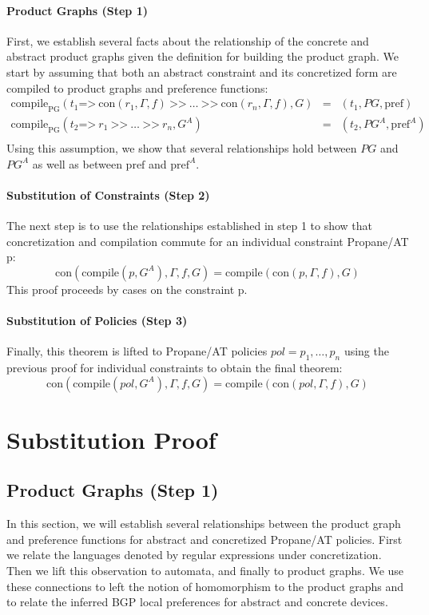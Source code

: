 \documentclass[twocolumn, openany]{sig-alternate-10pt}
\newcommand{\sysname}{{\small \sf Propane/AT}\xspace}
\newcommand{\para}[1]{\paragraph*{\textbf{#1}}}
\newcommand{\Prefer}{\texttt{>>}}
\newcommand{\Path}{\texttt{=>}}
\newcommand{\Con}{\mathrm{con}}
\newcommand{\CompilePg}{\ensuremath{\mathrm{compile}_\mathrm{PG}}}
\newcommand{\Compile}{\ensuremath{\mathrm{compile}}}
\newcommand{\Pref}{\ensuremath{\mathrm{pref}}}
\begin{document}
\para{Product Graphs (Step 1)} First, we establish several facts about the relationship of the concrete and abstract product graphs given the definition for building the product graph. We start by assuming that both an abstract constraint and its concretized form are compiled to product graphs and preference functions: 
%
\[
\begin{array}{lll}
  \CompilePg(t_1 \Path~ \Con(r_1,\Gamma,f) ~\Prefer~ \ldots ~\Prefer~ \Con(r_n,\Gamma,f), G) &=& (t_1, PG, \Pref) \\
  \CompilePg(t_2 \Path~ r_1 ~\Prefer~ \ldots ~\Prefer~ r_n, G^A) &=& (t_2, PG^A, \Pref^A) \\
\end{array}
\]
%
Using this assumption, we show that several relationships hold between $PG$ and $PG^A$ as well as between $\Pref$ and $\Pref^A$. 

\para{Substitution of Constraints (Step 2)} The next step is to use the relationships established in step 1 to show that concretization and compilation commute for an individual constraint \sysname p:
%
$$\Con(\Compile(p, G^A), \Gamma, f, G) = \Compile(\Con(p,\Gamma,f), G)$$
%
This proof proceeds by cases on the constraint p.

\para{Substitution of Policies (Step 3)} Finally, this theorem is lifted to \sysname policies $pol = p_1, \ldots, p_n$ using the previous proof for individual constraints to obtain the final theorem:
%
$$\Con(\Compile(pol,G^A),\Gamma,f,G) = \Compile(\Con(pol,\Gamma,f), G)$$ 

\newpage


\section{Substitution Proof}

\subsection{Product Graphs (Step 1)}
In this section, we will establish several relationships between the product graph and preference functions for abstract and concretized \sysname policies. First we relate the languages denoted by regular expressions under concretization. Then we lift this observation to automata, and finally to product graphs. We use these connections to left the notion of homomorphism to the product graphs and to relate the inferred BGP local preferences for abstract and concrete devices.


\newcommand{\Lang}{\ensuremath{\mathcal{L}}}
\end{document}
